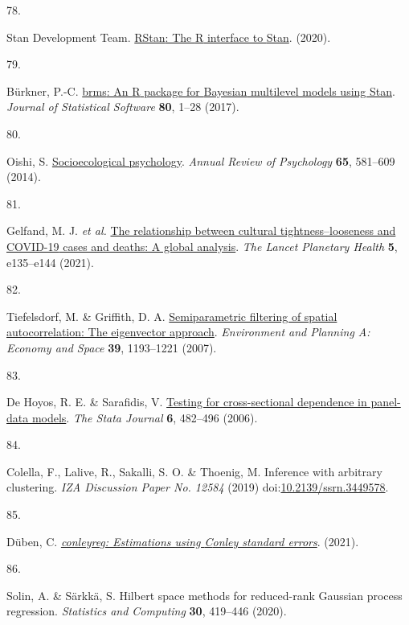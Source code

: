 \documentclass[
  man,floatsintext]{apa6}
\newlength{\cslhangindent}
\newlength{\csllabelwidth}
\newlength{\cslentryspacingunit} %
\newenvironment{CSLReferences}[2] %
 {%
  \setlength{\parindent}{0pt}
  \ifodd #1
  \let\oldpar\par
  \def\par{\hangindent=\cslhangindent\oldpar}
  \fi
  \setlength{\parskip}{#2\cslentryspacingunit}
 }%
 {}
\newcommand{\CSLLeftMargin}[1]{\parbox[t]{\csllabelwidth}{#1}}
\newcommand{\CSLRightInline}[1]{\parbox[t]{\linewidth - \csllabelwidth}{#1}\break}
\begin{document}
\begin{CSLReferences}{0}{0}
\leavevmode{}%
\CSLLeftMargin{78. }%
\CSLRightInline{Stan Development Team. \href{http://mc-stan.org/}{{RStan}: The {R} interface to {Stan}}. (2020).}

\leavevmode{}%
\CSLLeftMargin{79. }%
\CSLRightInline{Bürkner, P.-C. \href{https://doi.org/10.18637/jss.v080.i01}{{brms}: An {R} package for {Bayesian} multilevel models using {Stan}}. \emph{Journal of Statistical Software} \textbf{80}, 1--28 (2017).}

\leavevmode{}%
\CSLLeftMargin{80. }%
\CSLRightInline{Oishi, S. \href{https://doi.org/10.1146/annurev-psych-030413-152156}{Socioecological psychology}. \emph{Annual Review of Psychology} \textbf{65}, 581--609 (2014).}

\leavevmode{}%
\CSLLeftMargin{81. }%
\CSLRightInline{Gelfand, M. J. \emph{et al.} \href{https://doi.org/10.1016/S2542-5196(20)30301-6}{The relationship between cultural tightness--looseness and {COVID-19} cases and deaths: A global analysis}. \emph{The Lancet Planetary Health} \textbf{5}, e135--e144 (2021).}

\leavevmode{}%
\CSLLeftMargin{82. }%
\CSLRightInline{Tiefelsdorf, M. \& Griffith, D. A. \href{https://doi.org/10.1068/a37378}{Semiparametric filtering of spatial autocorrelation: The eigenvector approach}. \emph{Environment and Planning A: Economy and Space} \textbf{39}, 1193--1221 (2007).}

\leavevmode{}%
\CSLLeftMargin{83. }%
\CSLRightInline{De Hoyos, R. E. \& Sarafidis, V. \href{https://doi.org/10.1177/1536867X0600600403}{Testing for cross-sectional dependence in panel-data models}. \emph{The Stata Journal} \textbf{6}, 482--496 (2006).}

\leavevmode{}%
\CSLLeftMargin{84. }%
\CSLRightInline{Colella, F., Lalive, R., Sakalli, S. O. \& Thoenig, M. Inference with arbitrary clustering. \emph{IZA Discussion Paper No. 12584} (2019) doi:\href{https://doi.org/10.2139/ssrn.3449578}{10.2139/ssrn.3449578}.}

\leavevmode{}%
\CSLLeftMargin{85. }%
\CSLRightInline{Düben, C. \emph{\href{https://CRAN.R-project.org/package=conleyreg}{{conleyreg}: Estimations using {C}onley standard errors}}. (2021).}

\leavevmode{}%
\CSLLeftMargin{86. }%
\CSLRightInline{Solin, A. \& Särkkä, S. Hilbert space methods for reduced-rank {G}aussian process regression. \emph{Statistics and Computing} \textbf{30}, 419--446 (2020).}


\end{CSLReferences}
\end{document}
